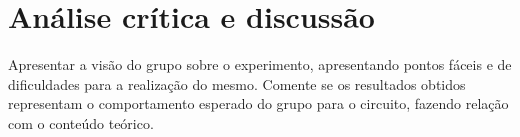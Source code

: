 \chapter{Análise crítica e discussão}
Apresentar  a  visão do  grupo  sobre  o  experimento,  apresentando  pontos  fáceis  e 
de  dificuldades  para  a  realização  do  mesmo.  Comente  se  os  resultados  obtidos 
representam  o  comportamento  esperado   do   grupo   para  o   circuito,   fazendo 
relação com o conteúdo teórico.